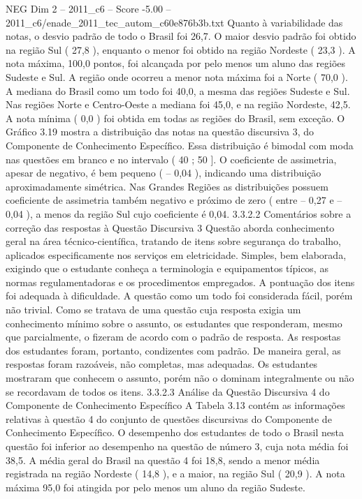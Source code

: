 \begin{textsample}{NEG Dim 2 – 2011\_c6 – Score -5.00 – 2011\_c6/enade\_2011\_tec\_autom\_c60e876b3b.txt}
Quanto à variabilidade das notas, o desvio padrão de todo o Brasil foi 26,7.
O maior desvio padrão foi obtido na região Sul ( 27,8 ), enquanto o menor foi obtido na região Nordeste ( 23,3 ).
A nota máxima, 100,0 pontos, foi alcançada por pelo menos um aluno das regiões Sudeste e Sul.
A região onde ocorreu a menor nota máxima foi a Norte ( 70,0 ).
A mediana do Brasil como um todo foi 40,0, a mesma das regiões Sudeste e Sul.
Nas regiões Norte e Centro-Oeste a mediana foi 45,0, e na região Nordeste, 42,5.
A nota mínima ( 0,0 ) foi obtida em todas as regiões do Brasil, sem exceção.
O Gráfico 3.19 mostra a distribuição das notas na questão discursiva 3, do Componente de Conhecimento Específico.
Essa distribuição é bimodal com moda nas questões em branco e no intervalo ( 40 ; 50 ].
O coeficiente de assimetria, apesar de negativo, é bem pequeno ( – 0,04 ), indicando uma distribuição aproximadamente simétrica.
Nas Grandes Regiões as distribuições possuem coeficiente de assimetria também negativo e próximo de zero ( entre – 0,27 e – 0,04 ), a menos da região Sul cujo coeficiente é 0,04. 3.3.2.2 Comentários sobre a correção das respostas à Questão Discursiva 3 Questão aborda conhecimento geral na área técnico-científica, tratando de itens sobre segurança do trabalho, aplicados especificamente nos serviços em eletricidade.
Simples, bem elaborada, exigindo que o estudante conheça a terminologia e equipamentos típicos, as normas regulamentadoras e os procedimentos empregados.
A pontuação dos itens foi adequada à dificuldade.
A questão como um todo foi considerada fácil, porém não trivial.
Como se tratava de uma questão cuja resposta exigia um conhecimento mínimo sobre o assunto, os estudantes que responderam, mesmo que parcialmente, o fizeram de acordo com o padrão de resposta.
As respostas dos estudantes foram, portanto, condizentes com padrão.
De maneira geral, as respostas foram razoáveis, não completas, mas adequadas.
Os estudantes mostraram que conhecem o assunto, porém não o dominam integralmente ou não se recordavam de todos os itens. 3.3.2.3 Análise da Questão Discursiva 4 do Componente de Conhecimento Específico A Tabela 3.13 contém as informações relativas à questão 4 do conjunto de questões discursivas do Componente de Conhecimento Específico.
O desempenho dos estudantes de todo o Brasil nesta questão foi inferior ao desempenho na questão de número 3, cuja nota média foi 38,5.
A média geral do Brasil na questão 4 foi 18,8, sendo a menor média registrada na região Nordeste ( 14,8 ), e a maior, na região Sul ( 20,9 ).
A nota máxima 95,0 foi atingida por pelo menos um aluno da região Sudeste.

\end{textsample}
